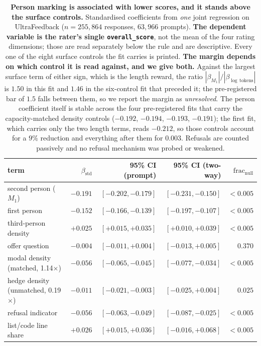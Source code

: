 \begin{table}[tb]
\centering\small
\caption{\textbf{Person marking is associated with lower scores, and it stands above the surface controls.} Standardised coefficients from \emph{one} joint regression on UltraFeedback ($n=255{,}864$ responses, $63{,}966$ prompts). \textbf{The dependent variable is the rater's single \texttt{overall\_score}}, not the mean of the four rating dimensions; those are read separately below the rule and are descriptive. Every one of the eight surface controls the fit carries is printed. \textbf{The margin depends on which control it is read against, and we give both.} Against the largest surface term of either sign, which is the length reward, the ratio $|\beta_{M_1}|/|\beta_{\log\,\mathrm{tokens}}|$ is $1.50$ in this fit and $1.46$ in the six-control fit that preceded it; the pre-registered bar of $1.5$ falls between them, so we report the margin as \emph{unresolved}. The person coefficient itself is stable across the four pre-registered fits that carry the capacity-matched density controls ($-0.192$, $-0.194$, $-0.193$, $-0.191$); the first fit, which carries only the two length terms, reads $-0.212$, so those controls account for a $9\%$ reduction and everything after them for $0.003$. Refusals are counted passively and no refusal mechanism was probed or weakened.}
\label{tab:scorer}
\begin{tabular}{lrrrr}
\toprule
term & $\beta_{\mathrm{std}}$ & 95\% CI (prompt) & 95\% CI (two-way) & $\mathrm{frac}_{\mathrm{null}}$ \\
\midrule
second person ($M_1$) & $-0.191$ & $[-0.202,-0.179]$ & $[-0.231,-0.150]$ & $<0.005$ \\
first person & $-0.152$ & $[-0.166,-0.139]$ & $[-0.197,-0.107]$ & $<0.005$ \\
third-person density & $+0.025$ & $[+0.015,+0.035]$ & $[+0.010,+0.039]$ & $<0.005$ \\
offer question & $-0.004$ & $[-0.011,+0.004]$ & $[-0.013,+0.005]$ & $0.370$ \\
modal density (matched, 1.14$\times$) & $-0.056$ & $[-0.065,-0.045]$ & $[-0.077,-0.034]$ & $<0.005$ \\
hedge density (unmatched, 0.19$\times$) & $-0.011$ & $[-0.021,-0.003]$ & $[-0.025,+0.004]$ & $0.025$ \\
refusal indicator & $-0.056$ & $[-0.063,-0.049]$ & $[-0.087,-0.025]$ & $<0.005$ \\
list/code line share & $+0.026$ & $[+0.015,+0.036]$ & $[-0.016,+0.068]$ & $<0.005$ \\

\end{tabular}
\end{table}
